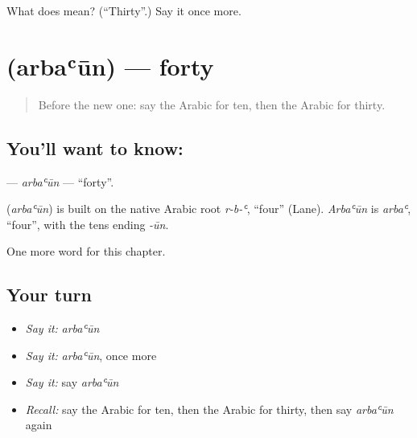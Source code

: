 \begin{tcolorbox}[breakable,colback=teal!4,colframe=teal!35!black,title={Before you move on}]
What does  mean? (\textquotedblleft{}Thirty\textquotedblright{}.) Say it once more.
\end{tcolorbox}
\section[\texorpdfstring{\ar{أربعون} (arbaʿūn)}{أربعون (arbaʿūn)}]{ (arbaʿūn) — forty}

\label{lesson:AR-C97-arbaun}



\begin{quote}
Before the new one: say the Arabic for ten, then the Arabic for thirty.
\end{quote}

\subsection*{You'll want to know: }
\textbf{} — \emph{arbaʿūn} — \textquotedblleft{}forty\textquotedblright{}.

\begin{cousinweb}
\textbf{} (\emph{arbaʿūn}) is built on the native Arabic root \emph{r-b-ʿ}, \textquotedblleft{}four\textquotedblright{} (Lane). \emph{Arbaʿūn} is \emph{arbaʿ}, \textquotedblleft{}four\textquotedblright{}, with the tens ending \emph{-ūn}.
\end{cousinweb}

\begin{grammarlens}[title={What you've built}]
One more word for this chapter.
\end{grammarlens}

\subsection*{Your turn}
\begin{itemize}
\raggedright
  \item \emph{Say it:} \emph{arbaʿūn}
  \item \emph{Say it:} \emph{arbaʿūn}, once more
  \item \emph{Say it:} say \emph{arbaʿūn}
  \item \emph{Recall:} say the Arabic for ten, then the Arabic for thirty, then say \emph{arbaʿūn} again
\end{itemize}

